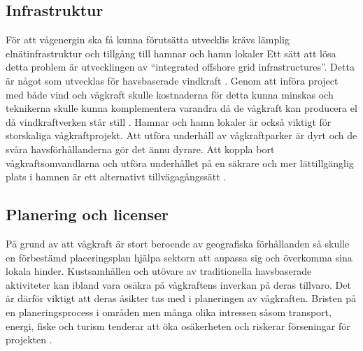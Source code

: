 \documentclass[10pt,a4paper,oneside]{article}
\begin{document}
\subsection{Infrastruktur}
För att vågenergin ska få kunna förutsätta utvecklis krävs lämplig elnätinfrastruktur och tillgång till hamnar och hamn lokaler Ett sätt att lösa detta problem är utvecklingen av “integrated offshore grid infrastructures”. Detta är något som utvecklas för havsbaserade vindkraft \cite{IRENA}. Genom att införa project med både vind och vågkraft skulle kostnaderna för detta kunna minskas och teknikerna skulle kunna komplementera varandra då de vågkraft kan producera el då vindkraftverken står still \cite{Yale}. Hamnar och hamn lokaler är också viktigt för storskaliga vågkraftprojekt. Att utföra underhåll av vågkraftparker är dyrt och de svåra havsförhållanderna gör det ännu dyrare. Att koppla bort vågkraftsomvandlarna och utföra underhållet på en säkrare och mer lättillgänglig plats i hamnen är ett alternativt tillvägagångssätt \cite{IRENA}. 

\subsection{Planering och licenser}
På grund av att vågkraft är stort beroende av geografiska förhållanden så skulle en förbestämd placeringsplan hjälpa sektorn att anpassa sig och överkomma sina lokala hinder. Kustsamhällen och utövare av traditionella havsbaserade aktiviteter kan ibland vara osäkra på vågkraftens inverkan på deras tillvaro. Det är därför viktigt att deras åsikter tas med i planeringen av vågkraften. Bristen på en planeringsprocess i områden men många olika intressen såsom transport, energi, fiske och turism tenderar att öka osäkerheten och riskerar förseningar för projekten \cite{IRENA}. 
\end{document}
